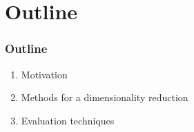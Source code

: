 \section{Outline}

\begin{frame}
	\frametitle{Outline}
	
	\begin{enumerate}
		\item Motivation
		\item Methods for a dimensionality reduction
		\item Evaluation techniques
	\end{enumerate}
\end{frame}
